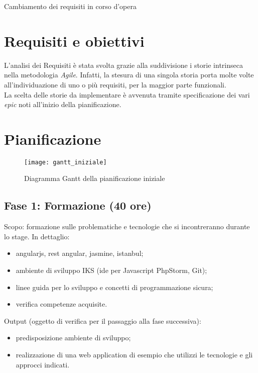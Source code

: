 \begin{risk}{Cambiamento dei requisiti in corso d'opera}

\section{Requisiti e obiettivi}
L'analisi dei Requisiti è stata svolta grazie alla suddivisione i storie intrinseca nella metodologia \emph{Agile}. Infatti, la stesura di una singola storia porta molte volte all'individuazione di uno o più requisiti, per la maggior parte funzionali.\\
La scelta delle storie da implementare è avvenuta tramite specificazione dei vari \emph{epic} noti all'inizio della pianificazione.

\section{Pianificazione}

\begin{figure}[H] 
    \centering 
    \texttt{[image: gantt\_iniziale]} 
    \caption{Diagramma Gantt della pianificazione iniziale}
\end{figure}

\subsection{Fase 1: Formazione (40 ore)}
Scopo: formazione sulle problematiche e tecnologie che si incontreranno durante lo stage.
In dettaglio:
\begin{itemize}
	\item angularjs, rest angular, jasmine, istanbul;
	\item ambiente di sviluppo IKS (\gls{ide} per Javascript PhpStorm, Git);
	\item linee guida per lo sviluppo e concetti di programmazione sicura;
	\item verifica competenze acquisite.
\end{itemize}
Output (oggetto di verifica per il passaggio alla fase successiva):
\begin{itemize}
	\item predisposizione ambiente di sviluppo;
	\item realizzazione di una web application di esempio che utilizzi le tecnologie e gli approcci
indicati.
\end{itemize}


\end{risk}
